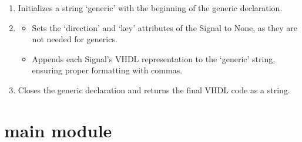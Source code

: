 \documentclass[letterpaper,10pt,english]{sphinxmanual}
\begin{document}
\begin{fulllineitems}
\begin{fulllineitems}
\begin{description}
\begin{enumerate}
\item {} 
\sphinxAtStartPar
Initializes a string ‘generic’ with the beginning of the generic declaration.

\item {} \begin{description}
\begin{itemize}
\item {} 
\sphinxAtStartPar
Sets the ‘direction’ and ‘key’ attributes of the Signal to None, as they are not needed for generics.

\item {} 
\sphinxAtStartPar
Appends each Signal’s VHDL representation to the ‘generic’ string, ensuring proper formatting with commas.

\end{itemize}

\end{description}

\item {} 
\sphinxAtStartPar
Closes the generic declaration and returns the final VHDL code as a string.

\end{enumerate}

\end{description}

\end{fulllineitems}


\end{fulllineitems}


\sphinxstepscope


\section{main module}
\label{\detokenize{main:module-main}}\label{\detokenize{main:main-module}}\label{\detokenize{main::doc}}

\begin{fulllineitems}
\label{\detokenize{main:main.main}}
\pysigstartsignatures
{}
\pysigstopsignatures
\end{fulllineitems}
\end{document}
